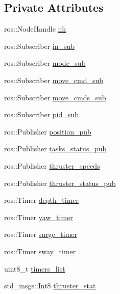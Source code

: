 \subsection*{Private Attributes}
\begin{DoxyCompactItemize}
\item 
ros\+::\+Node\+Handle \hyperlink{classControl_a8aa280a2e58b01b8cc3a62f839b28761}{nh}
\item 
ros\+::\+Subscriber \hyperlink{classControl_a0aa8e9ce906bd50de463b07fce71f7b8}{in\+\_\+sub}
\item 
ros\+::\+Subscriber \hyperlink{classControl_aa69c6ea7a8de7db73035a1db99ab3b47}{mode\+\_\+sub}
\item 
ros\+::\+Subscriber \hyperlink{classControl_a3b230d6b582855242669b6fffbb3d949}{move\+\_\+cmd\+\_\+sub}
\item 
ros\+::\+Subscriber \hyperlink{classControl_aef0dbc702813737f7860676376c58e2e}{move\+\_\+cmds\+\_\+sub}
\item 
ros\+::\+Subscriber \hyperlink{classControl_adee654d9ea9ce8b55e7a54f24b9bc8cf}{pid\+\_\+sub}
\item 
ros\+::\+Publisher \hyperlink{classControl_ae5593e99df99f6e78c3c3fba9cefa187}{position\+\_\+pub}
\item 
ros\+::\+Publisher \hyperlink{classControl_a3b6b1a9000c0a6eb5037b43fac65f79a}{tasks\+\_\+status\+\_\+pub}
\item 
ros\+::\+Publisher \hyperlink{classControl_a723ac5a2c2928cebde4b372f9feb4b0f}{thruster\+\_\+speeds}
\item 
ros\+::\+Publisher \hyperlink{classControl_a914384fbf8c6a3e58a485fc91c44d374}{thruster\+\_\+status\+\_\+pub}
\item 
ros\+::\+Timer \hyperlink{classControl_a2fb8968d2bdfa14be8d7c6a1931ac3ad}{depth\+\_\+timer}
\item 
ros\+::\+Timer \hyperlink{classControl_a774bb8a7f0b6355dd487eac011fc54e2}{yaw\+\_\+timer}
\item 
ros\+::\+Timer \hyperlink{classControl_a01b569ce4cb201b75b1304800c5957f1}{surge\+\_\+timer}
\item 
ros\+::\+Timer \hyperlink{classControl_a5b838b01bae62bcd23ddb8089a73b217}{sway\+\_\+timer}
\item 
uint8\+\_\+t \hyperlink{classControl_ac06b4442ca2a5141fe6d8637f0f4a169}{timers\+\_\+list}
\item 
std\+\_\+msgs\+::\+Int8 \hyperlink{classControl_a357ebd67bec91c792a7d904624a21ac6}{thruster\+\_\+stat}
\item 

\end{DoxyCompactItemize}
